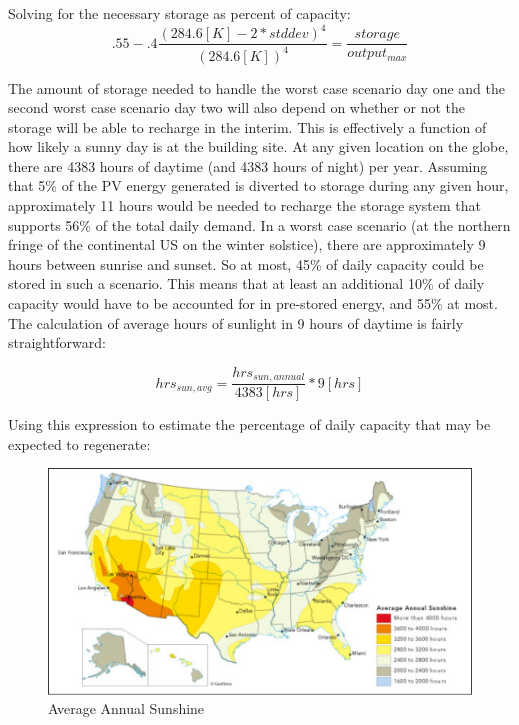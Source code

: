 Solving for the necessary storage as percent of capacity:
\begin{equation}
.55-.4\frac{(284.6[K]-2*stddev)^4}{(284.6[K])^4}=\frac{storage}{output_{max}}
\end{equation}

The amount of storage needed to handle the worst case scenario day one and the
second worst case scenario day two will also depend on whether or not the
storage will be able to recharge in the interim. This is effectively a function
of how likely a sunny day is at the building site. At any given location on the
globe, there are 4383 hours of daytime (and 4383 hours of night) per year.
Assuming that 5\% of the PV energy generated is diverted to storage during any
given hour, approximately 11 hours would be needed to recharge the storage
system that supports 56\% of the total daily demand. In a worst case scenario
(at the northern fringe of the continental US on the winter solstice), there
are approximately 9 hours between sunrise and sunset. So at most, 45\% of daily
capacity could be stored in such a scenario. This means that at least an
additional 10\% of daily capacity would have to be accounted for in pre-stored
energy, and 55\% at most. The calculation of average hours of sunlight in 9
hours of daytime is fairly straightforward:

\begin{equation}
hrs_{sun,avg}=\frac{hrs_{sun,annual}}{4383 [hrs]}*9 [hrs]
\end{equation}

Using this expression to estimate the percentage of daily capacity that may be
expected to regenerate:

\begin{figure}
\begin{center}
\includegraphics[scale=1.0]{pics/PatrickFigure4.png}
\caption{Average Annual Sunshine}
\label{p4}
\end{center}
\end{figure}

